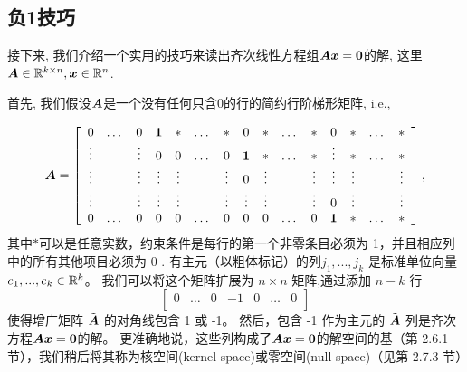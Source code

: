 \subsection{负1技巧}

接下来, 我们介绍一个实用的技巧来读出齐次线性方程组$\boldsymbol{A}\boldsymbol{x} = \boldsymbol{0}$的解,
这里$\boldsymbol{A} \in \mathbb{R}^{k \times n}, \boldsymbol{x} \in \mathbb{R}^n$.

首先, 我们假设$\boldsymbol{A}$是一个没有任何只含0的行的简约行阶梯形矩阵, i.e.,

\begin{equation}
    \boldsymbol{A} =
    \begin{bmatrix}
        \begin{array}{cccccccccccccccc}
                 0 & \dots &      0 &   \boldsymbol{1} &   \ast & \dots &   \ast &      0 &   \ast & \dots &   \ast &      0 & \ast & \dots & \ast \\
            \vdots &       & \vdots &      0 &      0 & \dots &      0 &     \boldsymbol{1} &   \ast & \dots &   \ast & \vdots & \ast & \dots & \ast \\
            \vdots &       & \vdots & \vdots & \vdots &       & \vdots &      0 & \vdots &       & \vdots & \vdots & \vdots & & \vdots \\
            \vdots &       & \vdots & \vdots & \vdots &       & \vdots & \vdots & \vdots &       & \vdots &      0 & \vdots & & \vdots \\
                 0 & \dots &      0 &      0 &      0 & \dots &      0 &      0 &      0 & \dots &      0 &     \boldsymbol{1} & \ast & \dots & \ast \\
        \end{array}
    \end{bmatrix},
\end{equation}
其中$\ast$可以是任意实数，约束条件是每行的第一个非零条目必须为 1，并且相应列中的所有其他项目必须为 0 .
有主元（以粗体标记）的列$j_1, ...,j_k$ 是标准单位向量 $e_1 , ..., e_k \in \mathbb{R}^k$。
我们可以将这个矩阵扩展为 $n \times n$ 矩阵,通过添加 $n − k$ 行
\begin{equation}
    \begin{bmatrix}
        0 & \dots & 0 & -1 & 0 & \dots & 0 \\
    \end{bmatrix}
\end{equation}
使得增广矩阵 $\tilde{\boldsymbol{A}}$ 的对角线包含 1 或 -1。
然后，包含 -1 作为主元的 $\tilde{\boldsymbol{A}}$ 列是齐次方程$\boldsymbol{A}\boldsymbol{x} = \boldsymbol{0}$的解。
更准确地说，这些列构成了$\boldsymbol{A}\boldsymbol{x} = \boldsymbol{0}$的解空间的基（第 2.6.1 节），我们稍后将其称为核空间(kernel space)或零空间(null space)（见第 2.7.3 节）

